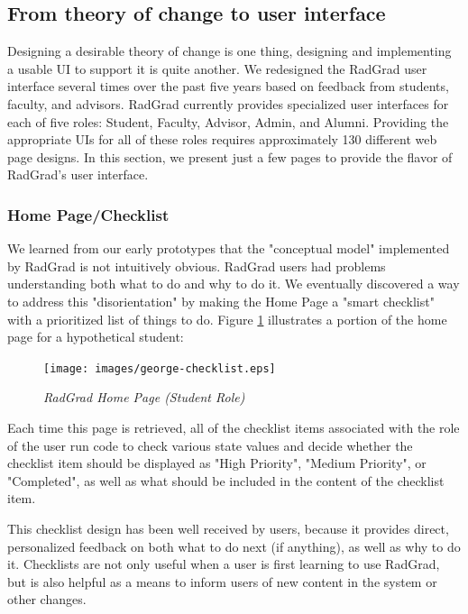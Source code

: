 \documentclass[acmsmall]{acmart}
\begin{document}
\subsection{From theory of change to user interface}

Designing a desirable theory of change is one thing, designing and implementing a usable UI to support it is quite another. We redesigned the RadGrad user interface several times over the past five years based on feedback from students, faculty, and advisors.  RadGrad currently provides specialized user interfaces for each of five roles: Student, Faculty, Advisor, Admin, and Alumni. Providing the appropriate UIs for all of these roles requires approximately 130 different web page designs. In this section, we present just a few pages to provide the flavor of RadGrad's user interface.

\subsubsection{Home Page/Checklist}

We learned from our early prototypes that the "conceptual model" implemented by RadGrad is not intuitively obvious. RadGrad users had problems understanding both what to do and why to do it.  We eventually discovered a way to address this "disorientation" by making the Home Page a "smart checklist" with a prioritized list of things to do.  Figure \ref{fig:radgrad-student-home-page} illustrates a portion of the home page for a hypothetical student:

\begin{figure}[ht]
\centering
\texttt{[image: images/george-checklist.eps]}
\caption{\em RadGrad Home Page (Student Role)}
\label{fig:radgrad-student-home-page}
\end{figure}

Each time this page is retrieved, all of the checklist items associated with the role of the user run code to check various state values and decide whether the checklist item should be displayed as "High Priority", "Medium Priority", or "Completed", as well as what should be included in the content of the checklist item.

This checklist design has been well received by users, because it provides direct, personalized feedback on both what to do next (if anything), as well as why to do it. Checklists are not only useful when a user is first learning to use RadGrad, but is also helpful as a means to inform users of new content in the system or other changes.
\end{document}
